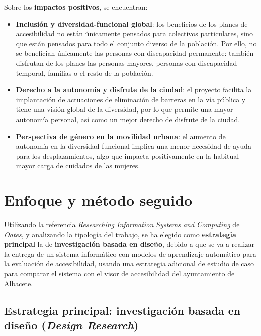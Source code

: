Sobre los \textbf{impactos positivos}, se encuentran:
\begin{itemize}
    \item \textbf{Inclusión y \gls{diversidad-funcional} global}: los beneficios de los planes de accesibilidad no están únicamente pensados para colectivos particulares, sino que están pensados para todo el conjunto diverso de la población. Por ello, no se benefician únicamente las personas con discapacidad permanente: también disfrutan de los planes las personas mayores, personas con discapacidad temporal, familias o el resto de la población.
    \item \textbf{Derecho a la autonomía y disfrute de la ciudad}: el proyecto facilita la implantación de actuaciones de eliminación de barreras en la vía pública y tiene una visión global de la diversidad, por lo que permite una mayor autonomía personal, así como un mejor derecho de disfrute de la ciudad. 
    \item \textbf{Perspectiva de género en la movilidad urbana}: el aumento de autonomía en la diversidad funcional implica una menor necesidad de ayuda para los desplazamientos, algo que impacta positivamente en la habitual mayor carga de cuidados de las mujeres.
\end{itemize}

\section{Enfoque y método seguido}

Utilizando la referencia \textit{Researching Information Systems and Computing} de \textit{Oates}, y analizando la tipología del trabajo, se ha elegido como \textbf{estrategia principal} la de \textbf{investigación basada en diseño}, debido a que se va a realizar la entrega de un sistema informático con modelos de aprendizaje automático para la evaluación de accesibilidad, usando una estrategia adicional de estudio de caso para comparar el sistema con el visor de accesibilidad del ayuntamiento de Albacete.
\\

\subsection{Estrategia principal: investigación basada en diseño (\textit{Design Research})}

